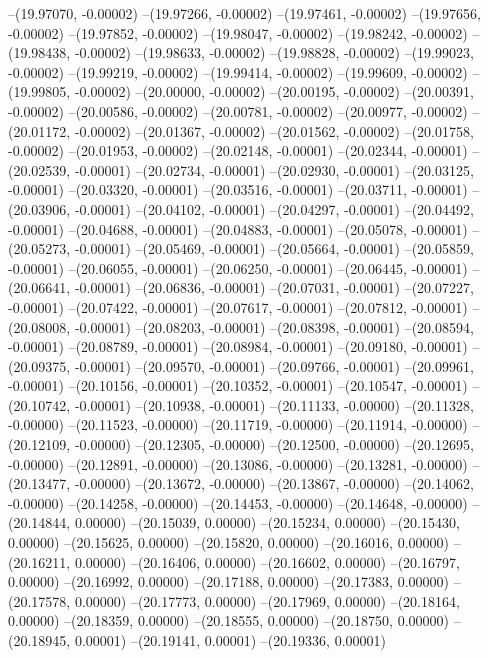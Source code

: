 --(19.97070, -0.00002)
--(19.97266, -0.00002)
--(19.97461, -0.00002)
--(19.97656, -0.00002)
--(19.97852, -0.00002)
--(19.98047, -0.00002)
--(19.98242, -0.00002)
--(19.98438, -0.00002)
--(19.98633, -0.00002)
--(19.98828, -0.00002)
--(19.99023, -0.00002)
--(19.99219, -0.00002)
--(19.99414, -0.00002)
--(19.99609, -0.00002)
--(19.99805, -0.00002)
--(20.00000, -0.00002)
--(20.00195, -0.00002)
--(20.00391, -0.00002)
--(20.00586, -0.00002)
--(20.00781, -0.00002)
--(20.00977, -0.00002)
--(20.01172, -0.00002)
--(20.01367, -0.00002)
--(20.01562, -0.00002)
--(20.01758, -0.00002)
--(20.01953, -0.00002)
--(20.02148, -0.00001)
--(20.02344, -0.00001)
--(20.02539, -0.00001)
--(20.02734, -0.00001)
--(20.02930, -0.00001)
--(20.03125, -0.00001)
--(20.03320, -0.00001)
--(20.03516, -0.00001)
--(20.03711, -0.00001)
--(20.03906, -0.00001)
--(20.04102, -0.00001)
--(20.04297, -0.00001)
--(20.04492, -0.00001)
--(20.04688, -0.00001)
--(20.04883, -0.00001)
--(20.05078, -0.00001)
--(20.05273, -0.00001)
--(20.05469, -0.00001)
--(20.05664, -0.00001)
--(20.05859, -0.00001)
--(20.06055, -0.00001)
--(20.06250, -0.00001)
--(20.06445, -0.00001)
--(20.06641, -0.00001)
--(20.06836, -0.00001)
--(20.07031, -0.00001)
--(20.07227, -0.00001)
--(20.07422, -0.00001)
--(20.07617, -0.00001)
--(20.07812, -0.00001)
--(20.08008, -0.00001)
--(20.08203, -0.00001)
--(20.08398, -0.00001)
--(20.08594, -0.00001)
--(20.08789, -0.00001)
--(20.08984, -0.00001)
--(20.09180, -0.00001)
--(20.09375, -0.00001)
--(20.09570, -0.00001)
--(20.09766, -0.00001)
--(20.09961, -0.00001)
--(20.10156, -0.00001)
--(20.10352, -0.00001)
--(20.10547, -0.00001)
--(20.10742, -0.00001)
--(20.10938, -0.00001)
--(20.11133, -0.00000)
--(20.11328, -0.00000)
--(20.11523, -0.00000)
--(20.11719, -0.00000)
--(20.11914, -0.00000)
--(20.12109, -0.00000)
--(20.12305, -0.00000)
--(20.12500, -0.00000)
--(20.12695, -0.00000)
--(20.12891, -0.00000)
--(20.13086, -0.00000)
--(20.13281, -0.00000)
--(20.13477, -0.00000)
--(20.13672, -0.00000)
--(20.13867, -0.00000)
--(20.14062, -0.00000)
--(20.14258, -0.00000)
--(20.14453, -0.00000)
--(20.14648, -0.00000)
--(20.14844, 0.00000)
--(20.15039, 0.00000)
--(20.15234, 0.00000)
--(20.15430, 0.00000)
--(20.15625, 0.00000)
--(20.15820, 0.00000)
--(20.16016, 0.00000)
--(20.16211, 0.00000)
--(20.16406, 0.00000)
--(20.16602, 0.00000)
--(20.16797, 0.00000)
--(20.16992, 0.00000)
--(20.17188, 0.00000)
--(20.17383, 0.00000)
--(20.17578, 0.00000)
--(20.17773, 0.00000)
--(20.17969, 0.00000)
--(20.18164, 0.00000)
--(20.18359, 0.00000)
--(20.18555, 0.00000)
--(20.18750, 0.00000)
--(20.18945, 0.00001)
--(20.19141, 0.00001)
--(20.19336, 0.00001)
